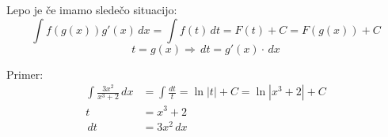 \documentclass[a4paper,oneside,12pt,fleqn]{article}
\newcommand\krat\cdot
\renewcommand{\d}{\ensuremath{\,d}} %
\newcommand{\dx}{\ensuremath{\d x}}
\newcommand{\dt}{\ensuremath{\d t}}
\renewcommand\implies\Rightarrow
\numberwithin{equation}{section}
\begin{document}
Lepo je če imamo sledečo situacijo:
\[ \int\!f(g(x))g'(x)\dx = \int\!f(t)\dt = F(t)+C = F(g(x)) + C \]
\[ t = g(x) \implies \dt = g'(x) \krat \dx \]

Primer:\\
\begin{align*}
  \int\!\frac{3x^2}{x^3+2}\dx &= \int\!\frac{dt}{t} = \ln|t| + C = \ln|x^3+2| + C \\
  t &= x^3+2 \\
  \dt &= 3x^2 \dx \\
\end{align*}


\pagebreak
\listoffigures
\end{document}
